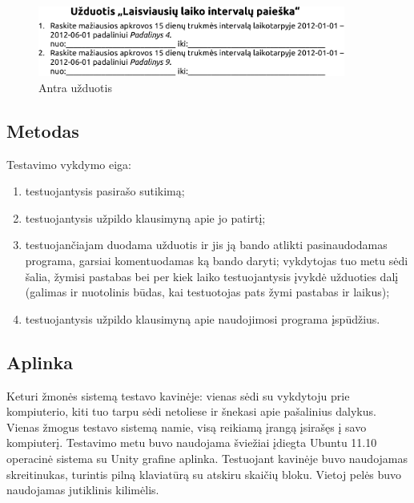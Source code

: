 \begin{figure}[H]
  \begin{center}
    \includegraphics[width=0.9\textwidth]{./4/pdfs/uzduotis2.pdf}
  \end{center}
  \caption{Antra užduotis}
  \label{fig:uzduotis_2}
\end{figure}

\subsection{Metodas}

Testavimo vykdymo eiga:
\begin{enumerate}
  \item testuojantysis pasirašo sutikimą;
  \item testuojantysis užpildo klausimyną apie jo patirtį;
  \item testuojančiajam duodama užduotis ir jis ją bando atlikti
    pasinaudodamas programa, garsiai komentuodamas ką bando daryti;
    vykdytojas tuo metu sėdi šalia, žymisi pastabas bei per kiek
    laiko testuojantysis įvykdė užduoties dalį (galimas ir nuotolinis
    būdas, kai testuotojas pats žymi pastabas ir laikus);
  \item testuojantysis užpildo klausimyną apie naudojimosi programa
    įspūdžius.
\end{enumerate}


\subsection{Aplinka}

Keturi žmonės sistemą testavo kavinėje: vienas sėdi su vykdytoju
prie kompiuterio, kiti tuo tarpu sėdi netoliese ir šnekasi apie
pašalinius dalykus. Vienas žmogus testavo sistemą namie, visą
reikiamą įrangą įsirašęs į savo kompiuterį. Testavimo metu buvo
naudojama šviežiai įdiegta Ubuntu 11.10 operacinė sistema su Unity
grafine aplinka. Testuojant kavinėje buvo naudojamas skreitinukas,
turintis pilną klaviatūrą su atskiru skaičių bloku. Vietoj pelės
buvo naudojamas jutiklinis kilimėlis.

